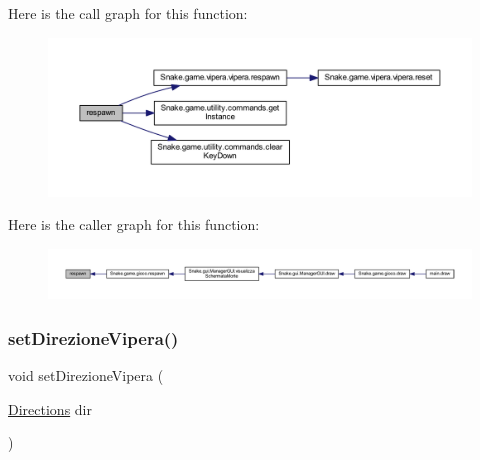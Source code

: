 Here is the call graph for this function\+:
\nopagebreak
\begin{figure}[H]
\begin{center}
\leavevmode
\includegraphics[width=350pt]{class_snake_1_1game_1_1utility_1_1game_manager_ac578ca44493fe34e6cb1b2093cf79341_cgraph}
\end{center}
\end{figure}
Here is the caller graph for this function\+:
\nopagebreak
\begin{figure}[H]
\begin{center}
\leavevmode
\includegraphics[width=350pt]{class_snake_1_1game_1_1utility_1_1game_manager_ac578ca44493fe34e6cb1b2093cf79341_icgraph}
\end{center}
\end{figure}
\mbox{\label{class_snake_1_1game_1_1utility_1_1game_manager_a6007259ace9d33bd56b9a6193e86df39}} 
\subsubsection{\texorpdfstring{set\+Direzione\+Vipera()}{setDirezioneVipera()}}
{\footnotesize\ttfamily void set\+Direzione\+Vipera (\begin{DoxyParamCaption}\item[{\mbox{\hyperlink{enum_snake_1_1game_1_1utility_1_1_directions}{Directions}}}]{dir }\end{DoxyParamCaption})}



